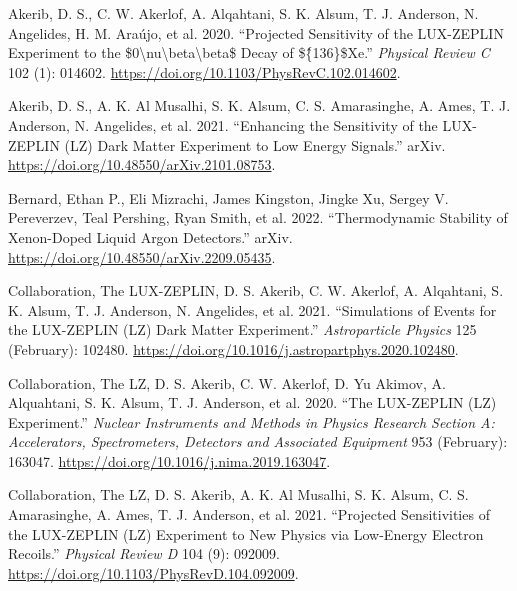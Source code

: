 \documentclass[
  10pt,
  letterpaper,
  DIV=11,
  numbers=noendperiod]{scrartcl}
\newlength{\cslhangindent}
\newlength{\cslentryspacingunit} %
\newenvironment{CSLReferences}[2] %
 {%
  \setlength{\parindent}{0pt}
  \ifodd #1
  \let\oldpar\par
  \def\par{\hangindent=\cslhangindent\oldpar}
  \fi
  \setlength{\parskip}{#2\cslentryspacingunit}
 }%
 {}
\begin{document}
\begin{CSLReferences}{1}{0}
\leavevmode{}%
Akerib, D. S., C. W. Akerlof, A. Alqahtani, S. K. Alsum, T. J. Anderson,
N. Angelides, H. M. Araújo, et al. 2020. {``Projected Sensitivity of the
{LUX-ZEPLIN} Experiment to the
\$0\textbackslash nu\textbackslash beta\textbackslash beta\$ Decay of
\$\{̂136\}\${Xe}.''} \emph{Physical Review C} 102 (1): 014602.
\url{https://doi.org/10.1103/PhysRevC.102.014602}.

\leavevmode{}%
Akerib, D. S., A. K. Al Musalhi, S. K. Alsum, C. S. Amarasinghe, A.
Ames, T. J. Anderson, N. Angelides, et al. 2021. {``Enhancing the
Sensitivity of the {LUX-ZEPLIN} ({LZ}) Dark Matter Experiment to Low
Energy Signals.''} {arXiv}.
\url{https://doi.org/10.48550/arXiv.2101.08753}.

\leavevmode{}%
Bernard, Ethan P., Eli Mizrachi, James Kingston, Jingke Xu, Sergey V.
Pereverzev, Teal Pershing, Ryan Smith, et al. 2022. {``Thermodynamic
{Stability} of {Xenon-Doped Liquid Argon Detectors}.''} {arXiv}.
\url{https://doi.org/10.48550/arXiv.2209.05435}.

\leavevmode{}%
Collaboration, The LUX-ZEPLIN, D. S. Akerib, C. W. Akerlof, A.
Alqahtani, S. K. Alsum, T. J. Anderson, N. Angelides, et al. 2021.
{``Simulations of {Events} for the {LUX-ZEPLIN} ({LZ}) {Dark Matter
Experiment}.''} \emph{Astroparticle Physics} 125 (February): 102480.
\url{https://doi.org/10.1016/j.astropartphys.2020.102480}.

\leavevmode{}%
Collaboration, The LZ, D. S. Akerib, C. W. Akerlof, D. Yu Akimov, A.
Alquahtani, S. K. Alsum, T. J. Anderson, et al. 2020. {``The
{LUX-ZEPLIN} ({LZ}) {Experiment}.''} \emph{Nuclear Instruments and
Methods in Physics Research Section A: Accelerators, Spectrometers,
Detectors and Associated Equipment} 953 (February): 163047.
\url{https://doi.org/10.1016/j.nima.2019.163047}.

\leavevmode{}%
Collaboration, The LZ, D. S. Akerib, A. K. Al Musalhi, S. K. Alsum, C.
S. Amarasinghe, A. Ames, T. J. Anderson, et al. 2021. {``Projected
Sensitivities of the {LUX-ZEPLIN} ({LZ}) Experiment to New Physics via
Low-Energy Electron Recoils.''} \emph{Physical Review D} 104 (9):
092009. \url{https://doi.org/10.1103/PhysRevD.104.092009}.


\end{CSLReferences}
\end{document}
